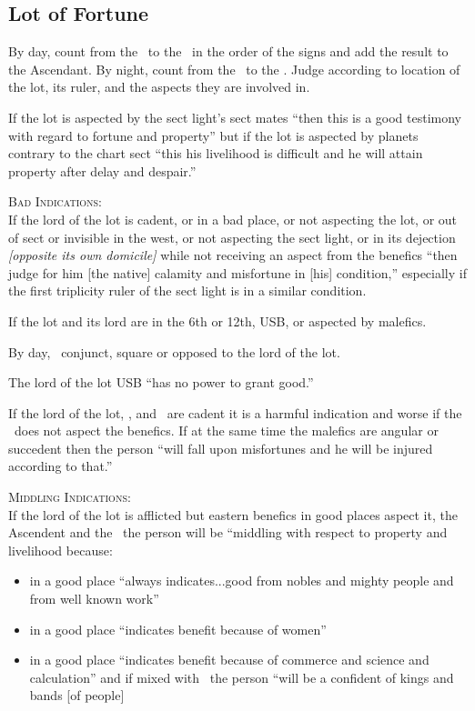 \subsection{Lot of Fortune}
By day, count from the \Sun\, to the \Moon\, in the order of the signs and add the result to the Ascendant. By night, count from the \Moon\, to the \Sun. Judge according to location of the lot, its ruler, and the aspects they are involved in.

If the lot is aspected by the sect light's sect mates ``then this is a good testimony with regard to fortune and property'' but if the lot is aspected by planets contrary to the chart sect ``this his livelihood is difficult and he will attain property after delay and despair.''

\noindent\textsc{Bad Indications:} \hfill \\
\indent If the lord of the lot is cadent, or in a bad place, or not aspecting the lot, or out of sect or invisible in the west,  or not aspecting the sect light, or in its dejection \textsl{[opposite its own domicile]} while not receiving an aspect from the benefics ``then judge for him [the native] calamity and misfortune in [his] condition,'' especially if the first triplicity ruler of the sect light is in a similar condition.

If the lot and its lord are in the 6th or 12th, USB, or aspected by malefics.

By day, \Mars\, conjunct, square or opposed to the lord of the lot.

The lord of the lot USB ``has no power to grant good.''

If the lord of the lot, \Jupiter, and \Venus\, are cadent it is a harmful indication and worse if the \Moon\, does not aspect the benefics. If at the same time the malefics are angular or succedent then the person ``will fall upon misfortunes and he will be injured according to that.''

\noindent\textsc{Middling Indications:} \hfill \\
If the lord of the lot is afflicted but eastern benefics in good places aspect it, the Ascendent and the \Moon\, the person will be ``middling with respect to property and livelihood because:
\begin{itemize}[topsep=0em,itemsep=0em]
\item[\Jupiter] in a good place ``always indicates...good from nobles and mighty people and from well known work''
\item[\Venus] in a good place ``indicates benefit because of women''
\item[\Mercury] in a good place ``indicates benefit because of commerce and science and calculation'' and if mixed with \Jupiter\, the person ``will be a confident of kings and bands [of people]
\end{itemize}

